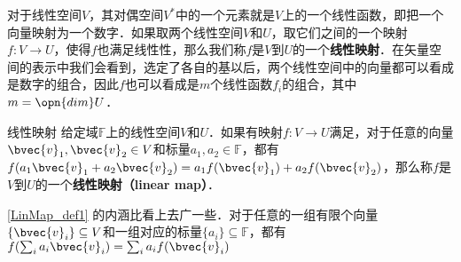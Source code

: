 
\begin{issues}
\issueDraft
{}
\end{issues}




对于线性空间$V$，其对偶空间$V^*$中的一个元素就是$V$上的一个线性函数，即把一个向量映射为一个数字．如果取两个线性空间$V$和$U$，取它们之间的一个映射$f:V\rightarrow U$，使得$f$也满足线性性，那么我们称$f$是$V$到$U$的一个\textbf{线性映射}．在矢量空间的表示中我们会看到，选定了各自的基以后，两个线性空间中的向量都可以看成是数字的组合，因此$f$也可以看成是$m$个线性函数$f_i$的组合，其中$m=\opn{dim}U$．

\begin{definition}{线性映射}\label{LinMap_def1}
给定域$\mathbb{F}$上的线性空间$V$和$U$．如果有映射$f:V\rightarrow U$满足，对于任意的向量$\bvec{v}_1, \bvec{v}_2\in V$和标量$a_1, a_2\in\mathbb{F}$，都有$f(a_1\bvec{v}_1+a_2\bvec{v}_2)=a_1f(\bvec{v}_1)+a_2f(\bvec{v}_2)$，那么称$f$是$V$到$U$的一个\textbf{线性映射（linear map）}．
\end{definition}


\autoref{LinMap_def1} 的内涵比看上去广一些．对于任意的一组有限个向量$\{\bvec{v}_i\}\subseteq V$和一组对应的标量$\{a_i\}\subseteq\mathbb{F}$，都有$f(\sum_i a_i\bvec{v}_i)=\sum_i a_if(\bvec{v}_i)$





